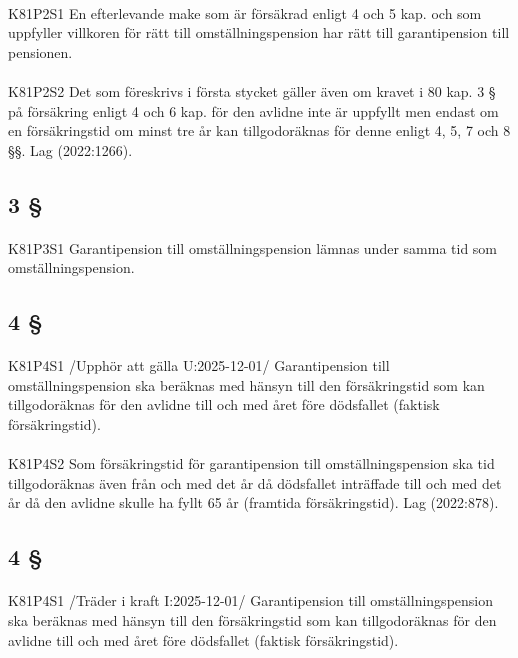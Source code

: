 \documentclass[a4paper,notitlepage,openany,10pt]{book}
\begin{document}
\paragraph*{}
{\tiny K81P2S1}
En efterlevande make som är försäkrad enligt 4 och 5 kap. och som uppfyller villkoren för rätt till omställningspension har rätt till garantipension till pensionen.
\paragraph*{}
{\tiny K81P2S2}
Det som föreskrivs i första stycket gäller även om kravet i 80 kap. 3 § på försäkring enligt 4 och 6 kap. för den avlidne inte är uppfyllt men endast om en försäkringstid om minst tre år kan tillgodoräknas för denne enligt 4, 5, 7 och 8 §§.
Lag (2022:1266).
\subsection*{3 §}
\paragraph*{}
{\tiny K81P3S1}
Garantipension till omställningspension lämnas under samma tid som omställningspension.
\subsection*{4 §}
\paragraph*{}
{\tiny K81P4S1}
/Upphör att gälla U:2025-12-01/
Garantipension till omställningspension ska beräknas med hänsyn till den försäkringstid som kan tillgodoräknas för den avlidne till och med året före dödsfallet (faktisk försäkringstid).
\paragraph*{}
{\tiny K81P4S2}
Som försäkringstid för garantipension till omställningspension ska tid tillgodoräknas även från och med det år då dödsfallet inträffade till och med det år då den avlidne skulle ha fyllt 65 år (framtida försäkringstid).
Lag (2022:878).
\subsection*{4 §}
\paragraph*{}
{\tiny K81P4S1}
/Träder i kraft I:2025-12-01/
Garantipension till omställningspension ska beräknas med hänsyn till den försäkringstid som kan tillgodoräknas för den avlidne till och med året före dödsfallet (faktisk försäkringstid).
\end{document}
